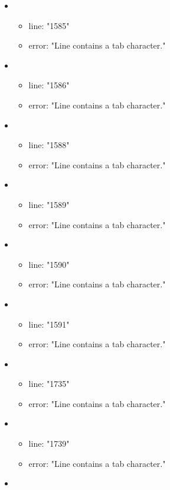 \begin{itemize}
\begin{itemize}
	\end{itemize}
	\item 
	\begin{itemize} 
		\item line: "1585" 
		\item error: "Line contains a tab character." 
	\end{itemize}
	\item 
	\begin{itemize} 
		\item line: "1586" 
		\item error: "Line contains a tab character." 
	\end{itemize}
	\item 
	\begin{itemize} 
		\item line: "1588" 
		\item error: "Line contains a tab character." 
	\end{itemize}
	\item 
	\begin{itemize} 
		\item line: "1589" 
		\item error: "Line contains a tab character." 
	\end{itemize}
	\item 
	\begin{itemize} 
		\item line: "1590" 
		\item error: "Line contains a tab character." 
	\end{itemize}
	\item 
	\begin{itemize} 
		\item line: "1591" 
		\item error: "Line contains a tab character." 
	\end{itemize}
	\item 
	\begin{itemize} 
		\item line: "1735" 
		\item error: "Line contains a tab character." 
	\end{itemize}
	\item 
	\begin{itemize} 
		\item line: "1739" 
		\item error: "Line contains a tab character." 
	\end{itemize}
	\item 
	\begin{itemize} 

\end{itemize}
\end{itemize}
